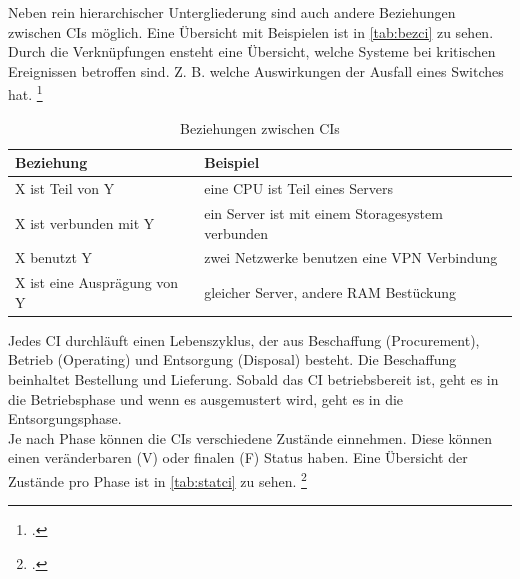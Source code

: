 Neben rein hierarchischer Untergliederung sind auch andere Beziehungen zwischen \acsp{CI} möglich. Eine Übersicht mit Beispielen ist in \autoref{tab:bezci} zu sehen.\\
Durch die Verknüpfungen ensteht eine Übersicht, welche Systeme bei kritischen Ereignissen betroffen sind. Z. B. welche Auswirkungen der Ausfall eines Switches hat.
\footcite[Vgl.][74\psq]{Olbrich_2008_ITIL}

\begin{table}[H]
\centering
\begin{tabularx}{0.8\textwidth}{l|X}
                            Beziehung & Beispiel \\\hline
                            X ist Teil von Y & eine CPU ist Teil eines Servers\\
                            X ist verbunden mit Y & ein Server ist mit einem Storagesystem verbunden \\
                            X benutzt Y & zwei Netzwerke benutzen eine VPN Verbindung \\
                            X ist eine Ausprägung von Y & gleicher Server, andere RAM Bestückung \\
\end{tabularx}
\caption{Beziehungen zwischen \aclp{CI}}
\label{tab:bezci}
\end{table}



Jedes \acs{CI} durchläuft einen Lebenszyklus, der aus Beschaffung (Procurement), Betrieb (Operating) und Entsorgung (Disposal) besteht.
Die Beschaffung beinhaltet Bestellung und Lieferung. Sobald das \acs{CI} betriebsbereit ist, geht es in die Betriebsphase und wenn es ausgemustert wird, geht es in die Entsorgungsphase.\\
Je nach Phase können die \acsp{CI} verschiedene Zustände einnehmen. Diese können einen veränderbaren (V) oder finalen (F) Status haben. Eine Übersicht der Zustände pro Phase ist in \autoref{tab:statci} zu sehen.
\footcite[Vgl.][76\psq]{Olbrich_2008_ITIL}

